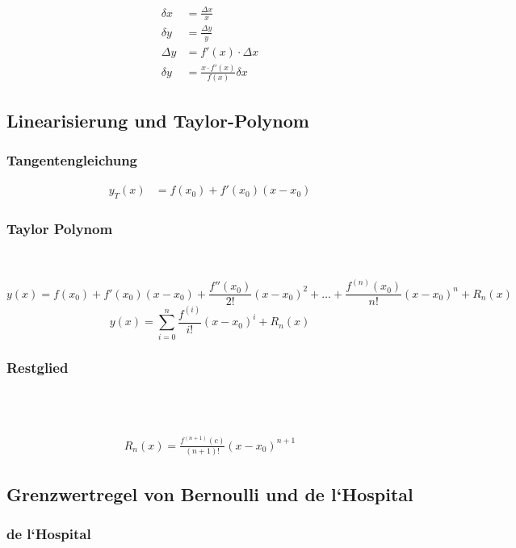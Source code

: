 \begin{align*} 
\delta x&=\frac{\Delta x}{x}\\
\delta y&=\frac{\Delta y}{y}\\
\Delta y&=f'(x)\cdot \Delta x\\
\delta y&=\frac{x\cdot f'(x)}{f(x)}\delta x
\end{align*}
         
\subsection{Linearisierung und Taylor-Polynom}

\subsubsection*{Tangentengleichung}

\begin{align*} 
y_T(x)&=f(x_0)+f'(x_0)(x-x_0)
\end{align*}

\subsubsection*{Taylor Polynom}
\\
 
\[y(x)=f(x_0)+f'(x_0)(x-x_0)+\frac{f''(x_0)}{2!}(x-x_0)^2+\dots+\frac{f^{(n)}(x_0)}{n!}(x-x_0)^n+R_n(x)\]
\[y(x)=\sum_{i=0}^n\frac{f^{(i)}}{i!}(x-x_0)^i+R_n(x)\]

\subsubsection*{Restglied}
\\
\\

\begin{align*} 
R_n(x)=\frac{f^{(n+1)}(c)}{(n+1)!}(x-x_0)^{n+1}
\end{align*}

\subsection{Grenzwertregel von Bernoulli und de l`Hospital}
\subsubsection*{de l`Hospital}

